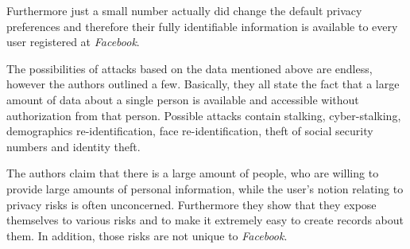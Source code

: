 Furthermore just a small number actually did change the default privacy
preferences and therefore their fully identifiable information is available to
every user registered at \textit{Facebook}.

The possibilities of attacks based on the data mentioned above are endless,
however the authors outlined a few. Basically, they all state the fact that
a large amount of data about a single person is available and accessible
without authorization from that person. Possible attacks contain stalking,
cyber-stalking, demographics re-identification, face re-identification, theft of
social security numbers and identity theft.

The authors claim that there is a large amount of people, who are willing to
provide large amounts of personal information, while the user's notion relating
to privacy risks is often unconcerned. Furthermore they show that they expose
themselves to various risks and to make it extremely easy to create records
about them. In addition, those risks are not unique to \textit{Facebook}.
